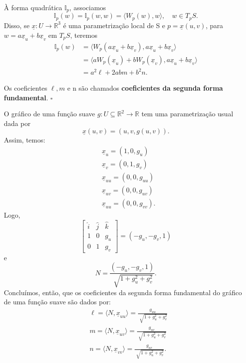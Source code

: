 \documentclass[../differential_geometry.tex]{subfiles}
\begin{document}
À forma quadrática \(\mathbb{I}_{p}\), associamos
\[
	\mathbb{I}_{p}(w) = \mathbb{I}_{p}(w, w) = \langle W_p(w), w \rangle, \quad w\in T_pS.
\]
Disso, se \(\underline{x}:U\rightarrow \mathbb{R}^{3}\) é uma parametrização local de S e \(p=\underline{x}(u, v)\), para \(w = a \underline{x}_u + b\underline{x}_v\) em \(T_pS\), teremos
\begin{align*}
	\mathbb{I}_p(w) & = \langle W_p(a\underline{x}_u + b\underline{x}_v), a\underline{x}_u + b\underline{x}_v \rangle          \\
	                & = \langle a W_p(\underline{x}_u) + b W_p(\underline{x}_v), a \underline{x}_u + b \underline{x}_v \rangle \\
	                & = a^{2}\ell +2ab m + b^{2}n.
\end{align*}
\begin{def*}
	Os coeficientes \(\ell , m\) e n são chamados \textbf{coeficientes da segunda forma fundamental}. \(\square\)
\end{def*}
\begin{example}
	O gráfico de uma função suave \(g:U\subseteq \mathbb{R}^{2}\rightarrow \mathbb{R}\) tem uma parametrização usual dada por
	\[
		\underline{x}(u, v) = (u, v, g(u, v)).
	\]
	Assim, temos:
	\begin{align*}
		 & \underline{x}_u = (1, 0, g_u)        \\
		 & \underline{x}_v = (0, 1, g_v)        \\
		 & \underline{x}_{uu} = (0, 0, g_{uu})  \\
		 & \underline{x}_{uv} = (0, 0, g_{uv})  \\
		 & \underline{x}_{uu} = (0, 0, g_{vv}).
	\end{align*}
	Logo,
	\[
		\begin{bmatrix}
			\hat{i} & \hat{j} & \hat{k} \\
			1       & 0       & g_u     \\
			0       & 1       & g_v
		\end{bmatrix} = (-g_u, -g_v, 1)
	\]
	e
	\[
		N = \frac{(-g_u, -g_v, 1)}{\sqrt[]{1 + g_{u}^{2} + g_{v}^{2}}}.
	\]
	Concluímos, então, que os coeficientes da segunda forma fundamental do gráfico de uma função suave são dados por:
	\begin{align*}
		 & \ell  = \langle N, \underline{x}_{uu} \rangle = \frac{g_{uu}}{\sqrt[]{1+g_u^{2}+g_{v}^{2}}} \\
		 & m = \langle N, \underline{x}_{uv} \rangle = \frac{g_{uv}}{\sqrt[]{1+g_u^{2}+g_{v}^{2}}}     \\
		 & n = \langle N, \underline{x}_{vv} \rangle = \frac{g_{uv}}{\sqrt[]{1+g_u^{2}+g_{v}^{2}}}.
	\end{align*}
\end{example}
\end{document}
